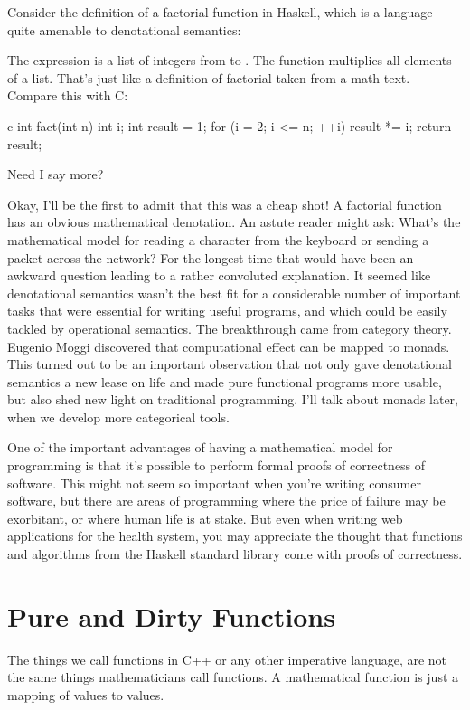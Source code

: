 Consider the definition of a factorial function in Haskell, which is a
language quite amenable to denotational semantics:

The expression \code{{[}1..n{]}} is a list of integers from  to .
The function  multiplies all elements of a list. That's
just like a definition of factorial taken from a math text. Compare this
with C:

\begin{snip}{c}
int fact(int n) {
    int i;
    int result = 1;
    for (i = 2; i <= n; ++i)
        result *= i;
    return result;
}
\end{snip}
Need I say more?

Okay, I'll be the first to admit that this was a cheap shot! A factorial
function has an obvious mathematical denotation. An astute reader might
ask: What's the mathematical model for reading a character from the
keyboard or sending a packet across the network? For the longest time
that would have been an awkward question leading to a rather convoluted
explanation. It seemed like denotational semantics wasn't the best fit
for a considerable number of important tasks that were essential for
writing useful programs, and which could be easily tackled by
operational semantics. The breakthrough came from category theory.
Eugenio Moggi discovered that computational effect can be mapped to
monads. This turned out to be an important observation that not only
gave denotational semantics a new lease on life and made pure functional
programs more usable, but also shed new light on traditional
programming. I'll talk about monads later, when we develop more
categorical tools.

One of the important advantages of having a mathematical model for
programming is that it's possible to perform formal proofs of
correctness of software. This might not seem so important when you're
writing consumer software, but there are areas of programming where the
price of failure may be exorbitant, or where human life is at stake. But
even when writing web applications for the health system, you may
appreciate the thought that functions and algorithms from the Haskell
standard library come with proofs of correctness.

\section{Pure and Dirty Functions}

The things we call functions in C++ or any other imperative language,
are not the same things mathematicians call functions. A mathematical
function is just a mapping of values to values.

